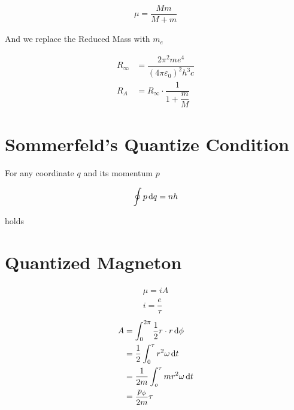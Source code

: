 \begin{equation*}
  \begin{aligned}
    \mu = \dfrac{Mm}{M + m} 
  \end{aligned}
\end{equation*}

And we replace the Reduced Mass with $m_e$

\begin{equation*}
  \begin{aligned}
    R_{\infty} &= \dfrac{2 \pi^2 m e^4}{\left( 4 \pi \varepsilon_0 \right)^2 h^3 c} \\
    R_A &= R_{\infty} \cdot \dfrac{1}{1 + \dfrac{m}{M} } 
  \end{aligned}
\end{equation*}

\section{Sommerfeld's Quantize Condition}

For any coordinate $q$ and its momentum $p$

\begin{equation*}
  \begin{aligned}
    \oint p \mathop{}\!\mathrm{d} q = n h
  \end{aligned}
\end{equation*}

holds

\section{Quantized Magneton}

\begin{equation*}
  \begin{aligned}
    \mu = i A \\
    i = \dfrac{e}{\tau} 
  \end{aligned}
\end{equation*}
\begin{equation*}
  \begin{aligned}
    A &= \int_0^{2 \pi} \dfrac{1}{2} r \cdot r \mathop{}\!\mathrm{d} \phi \\
    &= \dfrac{1}{2} \int_0^{\tau} r^2 \omega \mathop{}\!\mathrm{d} t \\
    &= \dfrac{1}{2 m} \int_o^{\tau} m r^2 \omega \mathop{}\!\mathrm{d} t \\
    &= \dfrac{p_{\phi}}{2 m} \tau 
  \end{aligned}
\end{equation*}

